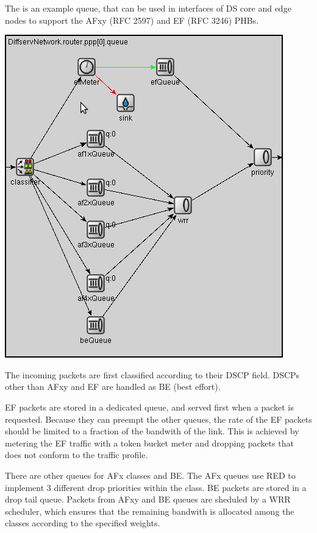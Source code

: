 The  is an example queue, that can be used in
interfaces of DS core and edge nodes to support
the AFxy (RFC 2597) and EF (RFC 3246) PHBs.

\begin{center}
\includegraphics[scale=0.7]{figures/DiffservQueue.png}
\end{center}

The incoming packets are first classified according to
their DSCP field. DSCPs other than AFxy and EF are handled
as BE (best effort).

EF packets are stored in a dedicated queue, and served first
when a packet is requested. Because they can preempt the other
queues, the rate of the EF packets should be limited to a fraction
of the bandwith of the link. This is achieved by metering the EF
traffic with a token bucket meter and dropping packets that
does not conform to the traffic profile.

There are other queues for AFx classes and BE. The AFx queues
use RED to implement 3 different drop priorities within the class.
BE packets are stored in a drop tail queue.
Packets from AFxy and BE queues are sheduled by a WRR scheduler,
which ensures that the remaining bandwith is allocated among the classes
according to the specified weights.



